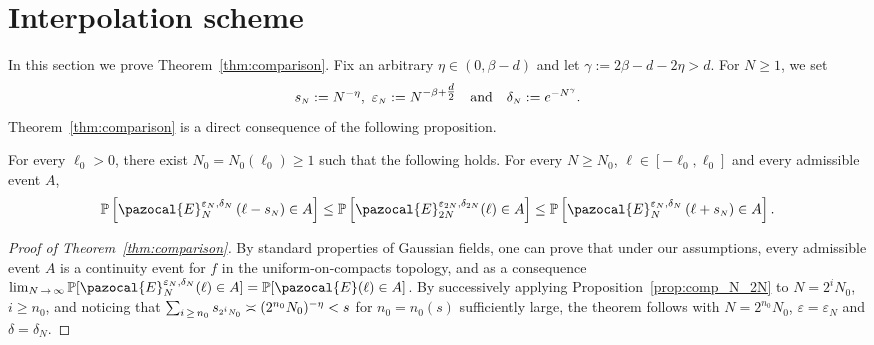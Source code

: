 \documentclass[10pt]{amsart}
\theoremstyle{definition}\newtheorem{defi}[theo]{Definition}\newtheorem{rema}[theo]{Remark}\newtheorem{exam}[theo]{Example}\newtheorem{exem}[theo]{Example}\newtheorem{nota}[theo]{Notation}
\renewcommand{\P}{\mathbb{P}}
\newcommand{\si}[1]{{\mathchoice{}{}{\scriptscriptstyle}{}#1}}
\newcommand{\sN}{{\mathchoice{}{}{\scriptscriptstyle}{}N}}
\begin{document}
\section{Interpolation scheme}\label{sec:interpolation}

In this section we prove Theorem~\ref{thm:comparison}. Fix an arbitrary $\eta\in(0,\beta-d)$ and let $\gamma:=2\beta-d-2\eta>d$. For $N\geq1$, we set
\begin{equation}\label{eq:choice_parameters}
s_{\sN}:=N^{-\eta},~\varepsilon_{\sN}:=N^{-\beta+\tfrac{d}{2}}\quad\text{and}\quad \delta_{\sN}:=e^{-N^\gamma}.
\end{equation}
Theorem~\ref{thm:comparison} is a direct consequence of the following proposition.

\begin{prop}\label{prop:comp_N_2N}
For every $\ell_0>0$, there exist $N_0=N_0(\ell_0)\geq1$ such that the following holds. For every $N\geq N_0$, $\ell\in[-\ell_0,\ell_0]$ and every admissible event $A$,
\begin{equation}\label{eq:comp_N_2N}
\P\left[\pazocal{E}_{N}^{\varepsilon_{\sN}, \delta_{\sN}}\left(\ell-s_{\sN}\right)\in A\right]\leq \P\left[\pazocal{E}_{2N}^{\varepsilon_{\si{2N}}, \delta_{\si{2N}}}(\ell)\in A\right]\leq \P\left[\pazocal{E}_{N}^{\varepsilon_{\sN}, \delta_{\sN}}\left(\ell+s_{\sN}\right)\in A\right].
\end{equation}
\end{prop}

\begin{proof}[Proof of Theorem~\ref{thm:comparison}]
By standard properties of Gaussian fields, one can prove that under our assumptions, every admissible event $A$ is a continuity event for $f$ in the uniform-on-compacts topology, and as a consequence $\lim_{N\,\to\,\infty} \P[\pazocal{E}_{N}^{\varepsilon_{\sN}, \delta_{\sN}}(\ell)\in A]=\P[\pazocal{E}(\ell)\in A]$. By successively applying Proposition~\ref{prop:comp_N_2N} to $N=2^iN_0$, $i\geq n_0$, and noticing that $\sum_{i\,\geq\,n_0} s_\si{2^i N_0}\asymp (2^{n_0} N_0)^{-\eta}< s$ for $n_0=n_0(s)$ sufficiently large, the theorem follows with $N=2^{n_0}N_0$, $\varepsilon=\varepsilon_{N}$ and $\delta=\delta_{N}$.
\end{proof}
\end{document}

